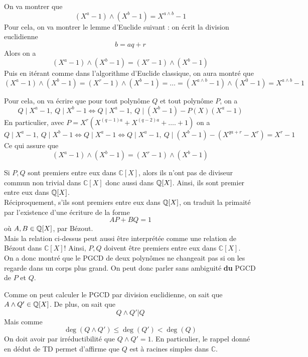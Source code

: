 \begin{sol}
On va montrer que
$$(X^a-1)\wedge (X^b-1)=X^{a\wedge b}-1 $$
Pour cela, on va montrer le lemme d'Euclide suivant : on écrit la division euclidienne
$$b=aq+r $$ Alors on a
$$(X^a-1)\wedge (X^b-1)=(X^r-1)\wedge (X^b-1) $$
Puis en itérant comme dans l'algorithme d'Euclide classique, on aura montré que
$$(X^a-1)\wedge (X^b-1)=(X^r-1)\wedge (X^b-1)=\dots=(X^{a\wedge b}-1)\wedge (X^0-1)=X^{a\wedge b}-1 $$

Pour cela, on va écrire que pour tout polynôme $Q$ et tout polynôme $P$, on a
$$Q\mid X^a-1, \: Q\mid X^b-1\iff Q\mid X^a-1, \: Q\mid (X^b-1)-P(X)(X^a-1) $$
En particulier, avec $P=X^r(X^{(q-1)a}+X^{(q-2)a}+\dots.+1)$ on a
$$Q\mid X^a-1, \: Q\mid X^b-1\iff Q\mid X^a-1 \iff Q\mid X^a-1, \: Q\mid (X^b-1)-(X^{qa+r}-X^r)=X^r-1$$
Ce qui assure que
$$(X^a-1)\wedge (X^b-1)=(X^r-1)\wedge (X^b-1) $$
\end{sol}


\begin{sol}
Si $P,Q$ sont premiers entre eux dans $\mathbb{C}[X]$, alors ils n'ont pas de diviseur commun non trivial dans $\mathbb{C}[X]$ donc aussi dans $\mathbb Q[X]$. Ainsi, ils sont premier entre eux dans $\mathbb Q[X]$. \\
Réciproquement, s'ils sont premiers entre eux dans $\mathbb Q[X]$, on traduit la primaité par l'existence d'une écriture de la forme
$$AP+BQ=1 $$
où $A,B\in \mathbb Q[X]$, par Bézout. \\
Mais la relation ci-dessus peut aussi être interprétée comme une relation de Bézout dans $\mathbb{C}[X]$! Ainsi, $P,Q$ doivent être premiers entre eux dans $\mathbb{C}[X]$. \\
On a donc montré que le PGCD de deux polynômes ne changeait pas si on les regarde dans un corps plus grand. On peut donc parler sans ambiguité \textbf{du} PGCD de $P$ et $Q$.
\end{sol}


\begin{sol}
Comme on peut calculer le PGCD par division euclidienne, on sait que $A\wedge Q'\in \mathbb Q[X]$. De plus, on sait que
$$Q\wedge Q'|Q $$ Mais comme
$$\deg(Q\wedge Q')\leq \deg(Q')<\deg(Q) $$
On doit avoir par irréductibilité que $Q\wedge Q'=1$. En particulier, le rappel donné en dédut de TD permet d'affirme que $Q$ est à racines simples dans $\mathbb{C}$.
\end{sol}


